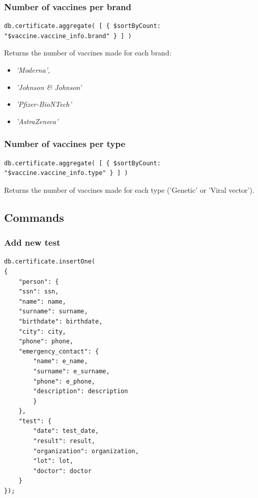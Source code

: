 \documentclass[12pt, a4paper]{article}
\begin{document}
\subsubsection{Number of vaccines per brand}
\begin{tcolorbox}[fontupper=\scriptsize]
    \begin{verbatim}
db.certificate.aggregate( [ { $sortByCount: "$vaccine.vaccine_info.brand" } ] )
    \end{verbatim}
\end{tcolorbox}

\noindent
Returns the number of vaccines made for each brand:
\begin{itemize}
    \item \emph{'Moderna'},
    \item \emph{'Johnson \& Johnson'}
    \item \emph{'Pfizer-BioNTech'}
    \item \emph{'AstraZeneca'}
\end{itemize}

\subsubsection{Number of vaccines per type}
\begin{tcolorbox}[fontupper=\scriptsize]
    \begin{verbatim}
db.certificate.aggregate( [ { $sortByCount: "$vaccine.vaccine_info.type" } ] )
    \end{verbatim}
\end{tcolorbox}

\noindent
Returns the number of vaccines made for each type ('Genetic' or 'Viral vector').

\subsection{Commands}

\subsubsection{Add new test} 
\begin{tcolorbox}[fontupper=\scriptsize]
    \begin{verbatim}
db.certificate.insertOne(
{ 
    "person": {
    "ssn": ssn,
    "name": name,
    "surname": surname,
    "birthdate": birthdate,
    "city": city,
    "phone": phone,
    "emergency_contact": {
        "name": e_name,
        "surname": e_surname,
        "phone": e_phone,
        "description": description
        }
    },
    "test": {
        "date": test_date,
        "result": result,
        "organization": organization,
        "lot": lot,
        "doctor": doctor
    }
});
    \end{verbatim}
\end{tcolorbox}
\end{document}
